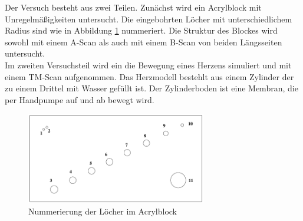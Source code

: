 Der Versuch besteht aus zwei Teilen. Zunächst wird ein Acrylblock mit Unregelmäßigkeiten untersucht. Die eingebohrten Löcher mit unterschiedlichem Radius sind wie in Abbildung \ref{fig:acrylblock} nummeriert. Die Struktur des Blockes wird sowohl mit einem A-Scan als auch mit einem B-Scan von beiden Längsseiten untersucht. \\
Im zweiten Versuchsteil wird ein die Bewegung eines Herzens simuliert und mit einem TM-Scan aufgenommen. Das Herzmodell bestehlt aus einem Zylinder der zu einem Drittel mit Wasser gefüllt ist. Der Zylinderboden ist eine Membran, die per Handpumpe auf und ab bewegt wird. 


\begin{figure}[h!]
	\centering
	\includegraphics[width=0.7\textwidth]{Acrylblock.png}
	\caption{Nummerierung der Löcher im Acrylblock}
	\label{fig:acrylblock}
\end{figure}
